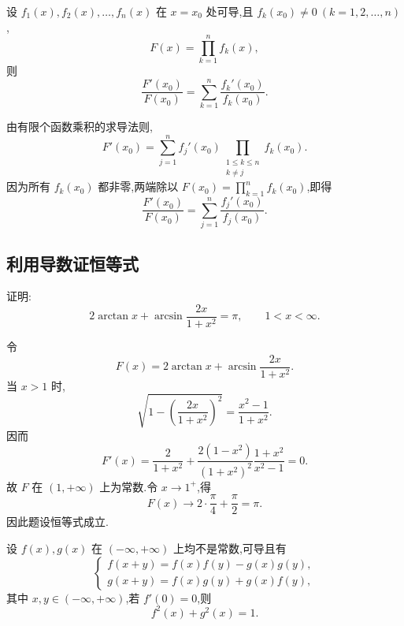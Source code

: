 \begin{example}
    设 $f_1(x),f_2(x),\ldots,f_n(x)$ 在 $x=x_0$ 处可导,且 $f_k(x_0)\neq0\ (k=1,2,\ldots,n)$,
    \[
        F(x)=\prod\limits_{k=1}^n f_k(x),
    \]
    则
    \[
        \dfrac{F'(x_0)}{F(x_0)}
        =\sum\limits_{k=1}^n\dfrac{f_k'(x_0)}{f_k(x_0)}.
    \]
\end{example}
\exampleblank

\begin{solution}
    由有限个函数乘积的求导法则,
    \[
        F'(x_0)=\sum\limits_{j=1}^{n}f_j'(x_0)
        \prod\limits_{\substack{1\leq k\leq n\\k\neq j}}f_k(x_0).
    \]
    因为所有 $f_k(x_0)$ 都非零,两端除以
    $F(x_0)=\displaystyle\prod\limits_{k=1}^{n}f_k(x_0)$,即得
    \[
        \dfrac{F'(x_0)}{F(x_0)}
        =\sum\limits_{j=1}^{n}\dfrac{f_j'(x_0)}{f_j(x_0)}.
    \]
\end{solution}



\subsection{利用导数证恒等式}

\begin{example}
    证明:
    \[
        2\arctan x+\arcsin\dfrac{2x}{1+x^2}=\pi,
        \qquad 1<x<\infty.
    \]
\end{example}
\exampleblank

\begin{solution}
    令
    \[
        F(x)=2\arctan x+\arcsin\dfrac{2x}{1+x^2}.
    \]
    当 $x>1$ 时,
    \[
        \sqrt{1-\left(\dfrac{2x}{1+x^2}\right)^2}
        =\dfrac{x^2-1}{1+x^2}.
    \]
    因而
    \[
        F'(x)=\dfrac{2}{1+x^2}
        +\dfrac{2(1-x^2)}{(1+x^2)^2}
        \dfrac{1+x^2}{x^2-1}=0.
    \]
    故 $F$ 在 $(1,+\infty)$ 上为常数.令 $x\to1^+$,得
    \[
        F(x)\longrightarrow2\cdot\dfrac{\pi}{4}+\dfrac{\pi}{2}=\pi.
    \]
    因此题设恒等式成立.
\end{solution}

\begin{example}
    设 $f(x),g(x)$ 在 $(-\infty,+\infty)$ 上均不是常数,可导且有
    \[
        \begin{cases}
            f(x+y)=f(x)f(y)-g(x)g(y), \\
            g(x+y)=f(x)g(y)+g(x)f(y),
        \end{cases}
    \]
    其中 $x,y\in(-\infty,+\infty)$,若 $f'(0)=0$,则
    \[
        f^2(x)+g^2(x)=1.
    \]
\end{example}
\exampleblank

